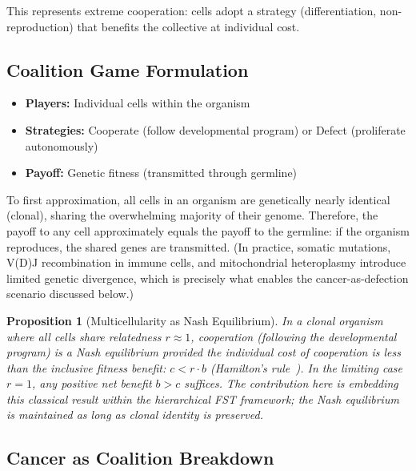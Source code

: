 \documentclass[12pt,a4paper]{article}
\newtheorem{proposition}{Proposition}
\theoremstyle{remark}
\begin{document}
This represents extreme cooperation: cells adopt a strategy (differentiation, non-reproduction) that benefits the collective at individual cost.

\subsection{Coalition Game Formulation}

\begin{itemize}
    \item \textbf{Players:} Individual cells within the organism
    \item \textbf{Strategies:} Cooperate (follow developmental program) or Defect (proliferate autonomously)
    \item \textbf{Payoff:} Genetic fitness (transmitted through germline)
\end{itemize}

To first approximation, all cells in an organism are genetically nearly identical (clonal), sharing the overwhelming majority of their genome. Therefore, the payoff to any cell approximately equals the payoff to the germline: if the organism reproduces, the shared genes are transmitted. (In practice, somatic mutations, V(D)J recombination in immune cells, and mitochondrial heteroplasmy introduce limited genetic divergence, which is precisely what enables the cancer-as-defection scenario discussed below.)

\begin{proposition}[Multicellularity as Nash Equilibrium]
\label{prop:multicellularity}
In a clonal organism where all cells share relatedness $r \approx 1$, cooperation (following the developmental program) is a Nash equilibrium provided the individual cost of cooperation is less than the inclusive fitness benefit: $c < r \cdot b$ (Hamilton's rule~\citep{Hamilton1964}). In the limiting case $r = 1$, any positive net benefit $b > c$ suffices. The contribution here is embedding this classical result within the hierarchical FST framework; the Nash equilibrium is maintained as long as clonal identity is preserved.
\end{proposition}

\subsection{Cancer as Coalition Breakdown}
\end{document}
